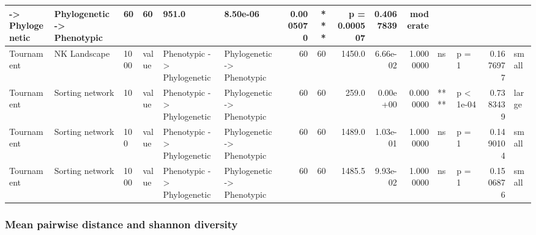 \documentclass[]{book}
\begin{document}
\begin{table}
\begin{tabular}[t]{l|l|l|l|l|l|r|r|r|r|r|l|l|r|l}
    ->
Phylogenetic & Phylogenetic
    ->
Phenotypic & 60 & 60 & 951.0 & 8.50e-06 & 0.0005070 & *** & p = 0.000507 & 0.4067839 & moderate\\
\hline
Tournament & NK Landscape & 1000 & value & Phenotypic
    ->
Phylogenetic & Phylogenetic
    ->
Phenotypic & 60 & 60 & 1450.0 & 6.66e-02 & 1.0000000 & ns & p = 1 & 0.1676977 & small\\
\hline
Tournament & Sorting network & 10 & value & Phenotypic
    ->
Phylogenetic & Phylogenetic
    ->
Phenotypic & 60 & 60 & 259.0 & 0.00e+00 & 0.0000000 & **** & p < 1e-04 & 0.7383439 & large\\
\hline
Tournament & Sorting network & 100 & value & Phenotypic
    ->
Phylogenetic & Phylogenetic
    ->
Phenotypic & 60 & 60 & 1489.0 & 1.03e-01 & 1.0000000 & ns & p = 1 & 0.1490104 & small\\
\hline
Tournament & Sorting network & 1000 & value & Phenotypic
    ->
Phylogenetic & Phylogenetic
    ->
Phenotypic & 60 & 60 & 1485.5 & 9.93e-02 & 1.0000000 & ns & p = 1 & 0.1506876 & small\\
\hline
\end{tabular}
\end{table}

\hypertarget{mean-pairwise-distance-and-shannon-diversity-1}{%
\subsubsection{Mean pairwise distance and shannon diversity}\label{mean-pairwise-distance-and-shannon-diversity-1}}
\end{document}
